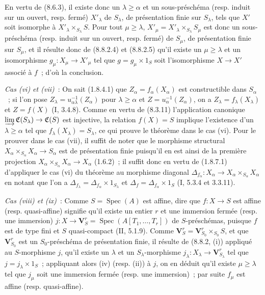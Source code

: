 En vertu de (8.6.3), il existe donc un $\lambda\geq\alpha$ et un
sous-préschéma (resp. induit sur un ouvert, resp. fermé) $X'_\lambda$ de
$S_\lambda$, de présentation finie sur $S_\lambda$, tels que $X'$ soit
isomorphe à $X'_\lambda\times_{S_\lambda}S$. Pour tout $\mu\geq\lambda$,
$X'_\mu=X'_\lambda\times_{S_\lambda}S_\mu$ est donc un sous-préschéma (resp.
induit sur un ouvert, resp. fermé) de $S_\mu$, de présentation finie sur
$S_\mu$, et il résulte donc de (8.8.2.4) et (8.8.2.5) qu'il existe un
$\mu\geq\lambda$ et un isomorphisme $g_\mu:X_\mu\to X'_\mu$ tel que
$g=g_\mu\times1_S$ soit l'isomorphisme $X\to X'$ associé à $f$~; d'où la
conclusion.

\emph{Cas (vi) et (vii)}~: On sait (1.8.4.1) que
$Z_\alpha=f_\alpha(X_\alpha)$ est constructible dans $S_\alpha$~; si l'on
pose $Z_\lambda=u_{\alpha\lambda}^{-1}(Z_\alpha)$ pour $\lambda\geq\alpha$
et $Z=u_\alpha^{-1}(Z_\alpha)$, on a $Z_\lambda=f_\lambda(X_\lambda)$ et
$Z=f(X)$ (I, 3.4.8). Comme en vertu de (8.3.11) l'application canonique
$\varinjlim\mathfrak C(S_\lambda)\to\mathfrak C(S)$ est injective, la
relation $f(X)=S$ implique l'existence d'un $\lambda\geq\alpha$ tel que
$f_\lambda(X_\lambda)=S_\lambda$, ce qui prouve le théorème dans le cas (vi).
Pour le prouver dans le cas (vii), il suffit de noter que le morphisme
structural $X_\alpha\times_{S_\alpha}X_\alpha\to S_\alpha$ est de présentation
finie puisqu'il en est ainsi de la première projection
$X_\alpha\times_{S_\alpha}X_\alpha\to X_\alpha$ (1.6.2)~; il suffit donc en
vertu de (1.8.7.1) d'appliquer le cas (vi) du théorème au morphisme diagonal
$\Delta_{f_\alpha}:X_\alpha\to X_\alpha\times_{S_\alpha}X_\alpha$ en notant
que l'on a $\Delta_{f_\lambda}=\Delta_{f_\alpha}\times1_{S_\lambda}$ et
$\Delta_f=\Delta_{f_\alpha}\times1_S$ (I, 5.3.4 et 3.3.11).

\emph{Cas (viii) et (ix)}~: Comme $S=\operatorname{Spec}(A)$ est affine, dire
que $f:X\to S$ est affine (resp. quasi-affine) signifie qu'il existe un entier
$r$ et une immersion fermée (resp. une immersion)
$j:X\to\mathbf V_S^r=\operatorname{Spec}(A[T_1,\ldots,T_r])$ de
$S$-préschémas, puisque $f$ est de type fini et $S$ quasi-compact
(II, 5.1.9). Comme
$\mathbf V_S^r=\mathbf V_{S_0}^r\times_{S_0}S$, et que
$\mathbf V_{S_0}^r$ est un $S_0$-préschéma de présentation finie, il résulte
de (8.8.2, (i)) appliqué au $S$-morphisme $j$, qu'il existe un $\lambda$ et un
$S_\lambda$-morphisme $j_\lambda:X_\lambda\to\mathbf V_{S_\lambda}^r$ tel que
$j=j_\lambda\times1_S$~; appliquant alors (iv) (resp. (ii)) à $j$, on en
déduit qu'il existe $\mu\geq\lambda$ tel que $j_\mu$ soit une immersion
fermée (resp. une immersion)~; par suite $f_\mu$ est affine (resp.
quasi-affine).

